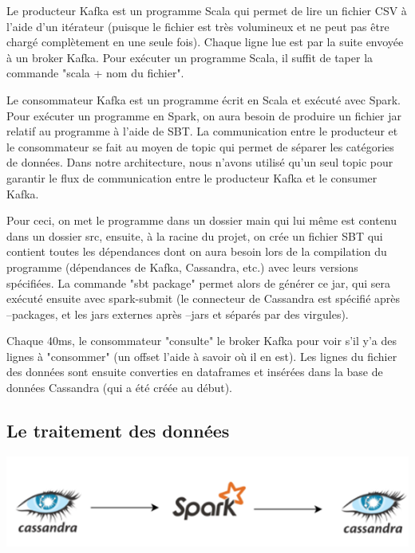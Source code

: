 \documentclass[a4paper, 11pt, titlepage]{article}
\begin{document}
Le producteur Kafka est un programme Scala qui permet de lire un fichier CSV à l'aide d'un itérateur (puisque le fichier est très volumineux et ne peut pas être chargé complètement en une seule fois). Chaque ligne lue est par la suite envoyée à un broker Kafka. Pour exécuter un programme Scala, il suffit de taper la commande "scala + nom du fichier".

Le consommateur Kafka est un programme écrit en Scala et exécuté avec Spark. Pour exécuter un programme en Spark, on aura besoin de produire un fichier jar relatif au programme à l'aide de SBT.  La communication entre le producteur et le consommateur se fait au moyen de topic qui permet de séparer les catégories de données. Dans notre architecture, nous n'avons utilisé qu'un seul topic pour garantir le flux de communication entre le producteur Kafka et le consumer Kafka.

Pour ceci, on met le programme dans un dossier main qui lui même est contenu dans un dossier src, ensuite, à la racine du projet, on crée un fichier SBT qui contient toutes les dépendances dont on aura besoin lors de la compilation du programme (dépendances de Kafka, Cassandra, etc.) avec leurs versions spécifiées. La commande "sbt package" permet alors de générer ce jar, qui sera exécuté ensuite avec spark-submit (le connecteur de Cassandra est spécifié après --packages, et les jars externes après --jars et séparés par des virgules).

Chaque 40ms, le consommateur "consulte" le broker Kafka pour voir s'il y'a des lignes à "consommer" (un offset l'aide à savoir où il en est). Les lignes du fichier des données sont ensuite converties en dataframes et insérées dans la base de données Cassandra (qui a été créée au début).
 

\subsection {Le traitement des données}

\begin{center}
    \includegraphics[scale=0.55]{res/demo2.png}
\end{center}
\end{document}
